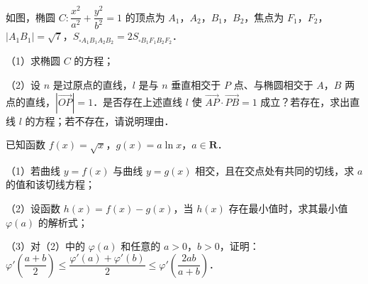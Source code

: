 \begin{question}
如图，椭圆 $C:\dfrac{x^2}{a^2}+\dfrac{y^2}{b^2}=1$ 的顶点为 $A_1$，$A_2$，$B_1$，$B_2$，焦点为 $F_1$，$F_2$，$|A_1B_1|=\sqrt7$，$S_{\square A_1B_1A_2B_2}=2S_{\square B_1F_1B_2F_2}$．

（1）求椭圆 $C$ 的方程；

（2）设 $n$ 是过原点的直线，$l$ 是与 $n$ 垂直相交于 $P$ 点、与椭圆相交于 $A$，$B$ 两点的直线，$|\overrightarrow{OP}|=1$．是否存在上述直线 $l$ 使 $\overrightarrow{AP}\cdot\overrightarrow{PB}=1$ 成立？若存在，求出直线 $l$ 的方程；若不存在，请说明理由．
\nopagebreak[4]
\begin{center}\end{center}
\nopagebreak[4]
\end{question}
\endgroup
\begin{question}
已知函数 $f(x)=\sqrt x$，$g(x)=a\ln x$，$a\in\mathbf R$．

（1）若曲线 $y=f(x)$ 与曲线 $y=g(x)$ 相交，且在交点处有共同的切线，求 $a$ 的值和该切线方程；

（2）设函数 $h(x)=f(x)-g(x)$，当 $h(x)$ 存在最小值时，求其最小值 $\varphi(a)$ 的解析式；

（3）对（2）中的 $\varphi(a)$ 和任意的 $a>0$，$b>0$，证明：$\varphi'\left(\dfrac{a+b}{2}\right)\leqslant\dfrac{\varphi'(a)+\varphi'(b)}{2}\leqslant\varphi'\left(\dfrac{2ab}{a+b}\right)$．

\end{question}